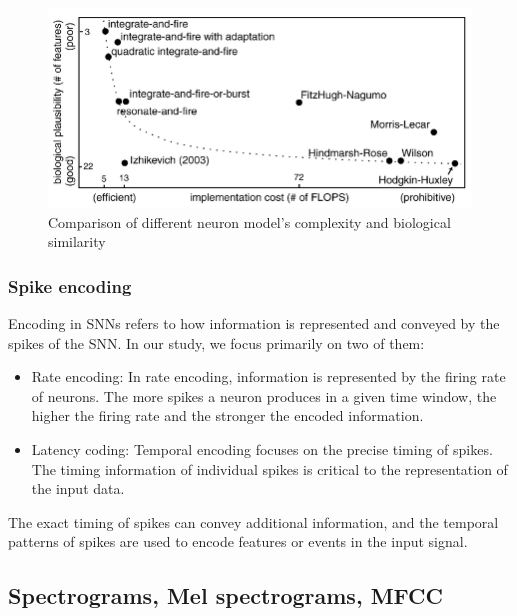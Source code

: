 \documentclass[11pt]{article}
\begin{document}
\begin{enumerate}
        \begin{figure}[h]
          \centering
          \begin{minipage}{0.9\textwidth}
            \centering
            \includegraphics[width=1\textwidth]{"image/comparison_neuron.png"}
            \caption{Comparison of different neuron model's complexity and biological similarity}
            \label{fig:neuron_comparison}
          \end{minipage}\hfill
        \end{figure}
\end{enumerate}

\subsubsection{Spike encoding}

Encoding in SNNs refers to how information is represented and conveyed by the spikes of the SNN. In our study, we focus primarily on two of them:

\begin{itemize}
  \item Rate encoding:
        \subitem In rate encoding, information is represented by the firing rate of neurons. The more spikes a neuron produces in a given time window, the higher the firing rate and the stronger the encoded information.
  \item Latency coding:
        \subitem Temporal encoding focuses on the precise timing of spikes. The timing information of individual spikes is critical to the representation of the input data.
\end{itemize}

The exact timing of spikes can convey additional information, and the temporal patterns of spikes are used to encode features or events in the input signal.


\subsection{Spectrograms, Mel spectrograms, MFCC}
\end{document}
